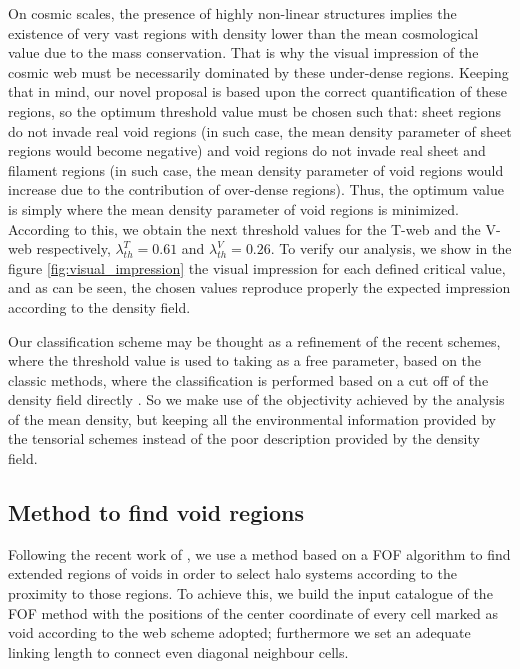 \documentclass[usenatbib]{latex/mn2e}
\begin{document}
On cosmic scales, the presence of highly non-linear structures implies the 
existence of very vast regions with density lower than the mean 
cosmological value due to the mass conservation. That is why the visual 
impression of the cosmic web must be necessarily dominated by these 
under-dense regions. Keeping that in mind, our novel proposal is based upon
the correct quantification of these regions, so the optimum threshold 
value must be chosen such that: sheet regions do not invade real void 
regions (in such case, the mean density parameter of sheet regions would 
become negative) and void regions do not invade real sheet and filament 
regions (in such case, the mean density parameter of void regions would 
increase due to the contribution of over-dense regions). Thus, the optimum 
value is simply where the mean density parameter of void regions is 
minimized. According to this, we obtain the next threshold values 
for the T-web and the V-web respectively, $\lambda_{th}^T = 0.61$ and 
$\lambda_{th}^V = 0.26$. To verify our analysis, we show in the figure 
\ref{fig:visual_impression} the visual impression for each defined critical 
value, and as can be seen, the chosen values reproduce properly the 
expected impression according to the density field. 



Our classification scheme may be thought as a refinement of the recent 
schemes, where the threshold value is used to taking as a free parameter, 
based on the classic methods, where the classification is performed 
based on a cut off of the density field directly .
So we make use of the objectivity achieved by the analysis of the mean 
density, but keeping all the environmental information provided by the
tensorial schemes instead of the poor description provided by the density 
field.



\subsection{Method to find void regions}
\label{subsec:method_voids}



Following the recent work of , we use a method 
based on a FOF algorithm to find extended regions of voids in order to
select halo systems according to the proximity to those regions. 
To achieve this, we build the input catalogue of the FOF method with the 
positions of the center coordinate of every cell marked as void according 
to the web scheme adopted; furthermore we set an adequate linking length 
to connect even diagonal neighbour cells.
\end{document}
